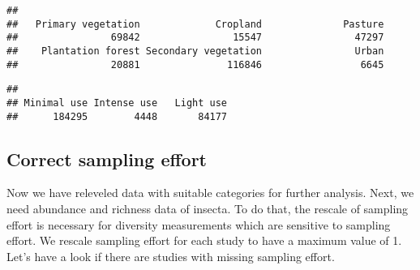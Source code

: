 \documentclass[
]{article}
\newenvironment{Shaded}{\begin{snugshade}}{\end{snugshade}}
\newcommand{\CommentTok}[1]{\textcolor[rgb]{0.56,0.35,0.01}{\textit{#1}}}
\newcommand{\FunctionTok}[1]{\textcolor[rgb]{0.00,0.00,0.00}{#1}}
\newcommand{\NormalTok}[1]{#1}
\newcommand{\SpecialCharTok}[1]{\textcolor[rgb]{0.00,0.00,0.00}{#1}}
\begin{document}
\begin{Shaded}
\end{Shaded}

\begin{verbatim}
## 
##   Primary vegetation             Cropland              Pasture 
##                69842                15547                47297 
##    Plantation forest Secondary vegetation                Urban 
##                20881               116846                 6645
\end{verbatim}

\begin{Shaded}
\end{Shaded}

\begin{verbatim}
## 
## Minimal use Intense use   Light use 
##      184295        4448       84177
\end{verbatim}

\hypertarget{correct-sampling-effort}{%
\subsection{Correct sampling effort}\label{correct-sampling-effort}}

Now we have releveled data with suitable categories for further
analysis. Next, we need abundance and richness data of insecta. To do
that, the rescale of sampling effort is necessary for diversity
measurements which are sensitive to sampling effort. We rescale sampling
effort for each study to have a maximum value of 1. Let's have a look if
there are studies with missing sampling effort.
\end{document}
